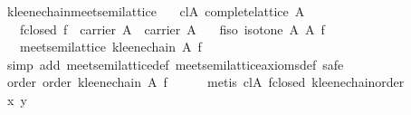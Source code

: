 \begin{isabellebody}
\isamarkupfalse%
%
\endisatagproof
{\isafoldproof}%
%
\isadelimproof
\isanewline
%
\endisadelimproof
\isanewline
{}\isamarkupfalse%
\ kleene{}chain{}meet{}semilattice{}\isanewline
\ \ \ cl{}A{}\ {}complete{}lattice\ A{}\isanewline
\ \ \ f{}closed{}\ {}f\ {}\ carrier\ A\ {}\ carrier\ A{}\isanewline
\ \ \ f{}iso{}\ {}isotone\ A\ A\ f{}\isanewline
\ \ \ {}meet{}semilattice\ {}kleene{}chain\ A\ f{}{}\isanewline
%
\isadelimproof
%
\endisadelimproof
%
\isatagproof
{}\isamarkupfalse%
\ {}simp\ add{}\ meet{}semilattice{}def\ meet{}semilattice{}axioms{}def{}\ safe{}\isanewline
\ \ \isamarkupfalse%
\ order{}\ {}order\ {}kleene{}chain\ A\ f{}{}\isanewline
\ \ \ \ \isamarkupfalse%
\ {}metis\ cl{}A\ f{}closed\ kleene{}chain{}order{}\isanewline
\ \ \isamarkupfalse%
\ x\ y\ \isamarkupfalse%

\end{isabellebody}
